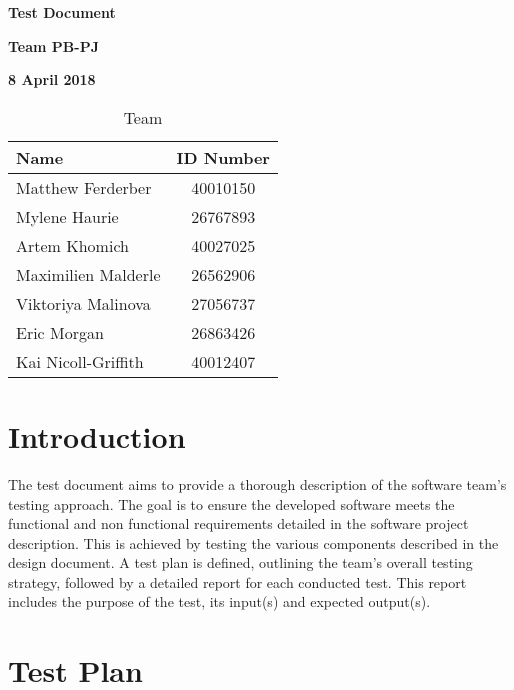 \documentclass[12pt]{article}
\begin{document}
\vspace*{0.5in}
\centerline{\bf\Large Test Document}

\vspace*{0.5in}
\centerline{\bf\Large Team PB-PJ}

\vspace*{0.5in}
\centerline{\bf\Large 8 April 2018}

\vspace*{1.5in}
\begin{table}[htbp]
\caption{Team}
\begin{center}
\begin{tabular}{|l | c|}
\hline
Name & ID Number \\
\hline
Matthew Ferderber & 40010150 \\
\hline
Mylene Haurie & 26767893 \\
\hline
Artem Khomich & 40027025 \\
\hline
Maximilien Malderle & 26562906 \\
\hline
Viktoriya Malinova & 27056737 \\
\hline
Eric Morgan & 26863426 \\
\hline 
Kai Nicoll-Griffith & 40012407 \\
\hline
\end{tabular}
\end{center}
\end{table}

\clearpage

\tableofcontents
\clearpage

\section{Introduction}

{
The test document aims to provide a thorough description of the software team's testing approach. The goal is to ensure the developed software meets the functional and non functional requirements detailed in the software project description. This is achieved by testing the various components described in the design document. A test plan is defined, outlining the team's overall testing strategy, followed by a detailed report for each conducted test. This report includes the purpose of the test, its input(s) and expected output(s).
}

\section{Test Plan}
\end{document}
